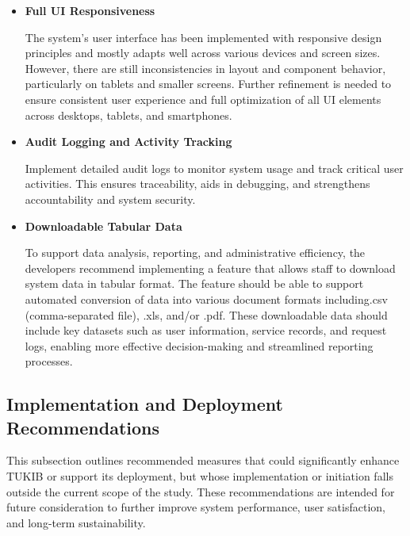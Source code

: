 \begin{itemize}
	\item \textbf{Full UI Responsiveness}
	
	The system’s user interface has been implemented with responsive design principles and mostly adapts well across various devices and screen sizes. However, there are still inconsistencies in layout and component behavior, particularly on tablets and smaller screens. Further refinement is needed to ensure consistent user experience and full optimization of all UI elements across desktops, tablets, and smartphones.

	\item \textbf{Audit Logging and Activity Tracking}
	
	Implement detailed audit logs to monitor system usage and track critical user activities. This ensures traceability, aids in debugging, and strengthens accountability and system security.
	
	\item \textbf{Downloadable Tabular Data}
	
	To support data analysis, reporting, and administrative efficiency, the developers recommend implementing a feature that allows staff to download system data in tabular format. The feature should be able to support automated conversion of data into various document formats including.csv (comma-separated file), .xls,	and/or .pdf. These downloadable data should include key datasets such as user information, service records, and request logs, enabling more effective decision-making and streamlined reporting processes.
	
\end{itemize}

\subsection{Implementation and Deployment Recommendations}

This subsection outlines recommended measures that could significantly enhance TUKIB or support its deployment, but whose implementation or initiation falls outside the current scope of the study. These recommendations are intended for future consideration to further improve system performance, user satisfaction, and long-term sustainability.


